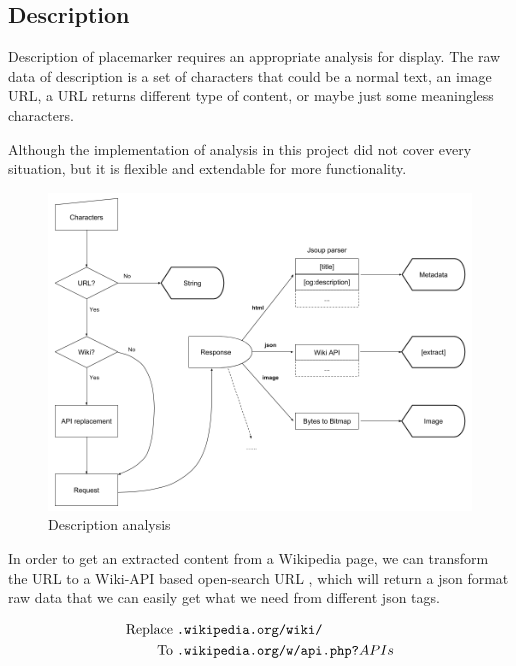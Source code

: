 \subsection{Description}

Description of placemarker requires an appropriate analysis for display. The raw data of description is a set of characters that could be a normal text, an image URL, a URL returns different type of content, or maybe just some meaningless characters.

Although the implementation of analysis in this project did not cover every situation, but it is flexible and extendable for more functionality.

\begin{figure}[H]
\caption{Description analysis}
\label{fig:description-analysis}
\centering
\includegraphics[width=\linewidth]{Figures/description-analysis.png}
\decoRule
\end{figure}

In order to get an extracted content from a Wikipedia page, we can transform the URL to a Wiki-API based open-search URL \cite{wiki.api.2016}, which will return a json format raw data that we can easily get what we need from different json tags.

\[
\begin{array}{lr}
\begin{aligned}
\text{Replace}\;&\texttt{.wikipedia.org/wiki/}\\
\text{To}\;&\texttt{.wikipedia.org/w/api.php?}APIs\\
\end{aligned}
\end{array}
\]

